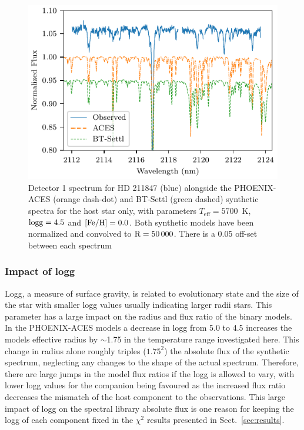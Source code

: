 \documentclass[fleqn,usenatbib]{mnras}
\begin{document}
\begin{figure}
    \centering
    \includegraphics[width=0.95\hsize]{images/fig10.pdf}
    \caption{Detector 1 spectrum for {HD 211847} (blue) alongside the PHOENIX-ACES (orange dash-dot) and {BT-Settl} (green dashed) synthetic spectra for the host star only, with parameters \(T_{\textrm{eff}}=5700\)~K, \(\rm logg=4.5\) and \(\rm [Fe/H]=0.0\). Both synthetic models have been normalized and convolved to \(\rm R=50\,000\). There is a 0.05 off-set between each spectrum}
    \label{fig:hd211847-models}
\end{figure}

\subsubsection{Impact of logg}
\label{subsubsec:logg}
Logg, a measure of surface gravity, is related to evolutionary state and the size of the star with smaller logg values usually indicating larger radii stars. This parameter has a large impact on the radius and flux ratio of the binary models. In the PHOENIX-ACES models a decrease in logg from 5.0 to 4.5 increases the models effective radius by \(\sim\)1.75 in the temperature range investigated here. This change in radius alone roughly triples (\(1.75^2\)) the absolute flux of the synthetic spectrum, neglecting any changes to the shape of the actual spectrum. Therefore, there are large jumps in the model flux ratios if the logg is allowed to vary, with lower logg values for the companion being favoured as the increased flux ratio decreases the mismatch of the host component to the observations. This large impact of logg on the spectral library absolute flux is one reason for keeping the logg of each component fixed in the \(\chi^2\) results presented in Sect.~\ref{sec:results}.
\end{document}
